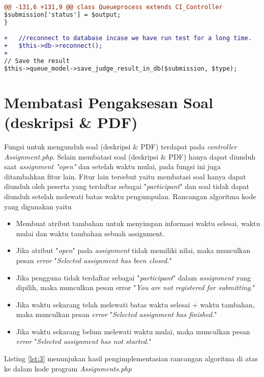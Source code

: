 \begin{lstlisting}[language=diff, caption=Perubahan kode program pada \textit{Queueprocess.php}, label=lst:2, basicstyle=\ttfamily, frame=single,
columns=fullflexible, keepspaces=true]
@@ -131,6 +131,9 @@ class Queueprocess extends CI_Controller
$submission['status'] = $output;
}

+   //reconnect to database incase we have run test for a long time.
+   $this->db->reconnect();
+
// Save the result
$this->queue_model->save_judge_result_in_db($submission, $type);
\end{lstlisting}

\section{Membatasi Pengaksesan Soal (deskripsi \& PDF)}%
\label{chap:batassoal}
Fungsi untuk mengunduh soal (deskripsi \& PDF) terdapat pada \textit{controller Assignment.php}. Selain membatasi soal (deskripsi \& PDF) hanya dapat diunduh saat \textit{assignment "open"} dan setelah waktu mulai, pada fungsi ini juga ditambahkan fitur lain. Fitur lain tersebut yaitu membatasi soal hanya dapat diunduh oleh peserta yang terdaftar sebagai "\textit{participant}" dan soal tidak dapat diunduh setelah melewati batas waktu pengumpulan. Rancangan algoritma kode yang digunakan yaitu
\begin{itemize}
	\item Membuat atribut tambahan untuk menyimpan informasi waktu selesai, waktu mulai dan waktu tambahan sebuah assignment.
	\item Jika atribut "\textit{open}" pada \textit{assignment} tidak memiliki nilai, maka munculkan pesan \textit{error} "\textit{Selected assignment has been closed}."
	\item Jika pengguna tidak terdaftar sebagai "\textit{participant}" dalam \textit{assignment} yang dipilih, maka munculkan pesan error "\textit{You are not registered for submitting}."
	\item Jika waktu sekarang telah melewati batas waktu selesai + waktu tambahan, maka munculkan pesan \textit{error} "\textit{Selected assignment has finished}."
	\item Jika waktu sekarang belum melewati waktu mulai, maka munculkan pesan \textit{error} "\textit{Selected assignment has not started}."	
\end{itemize}

Listing \ref{lst:3} menunjukan hasil pengimplementasian rancangan algoritma di atas ke dalam kode program \textit{Assignments.php}

